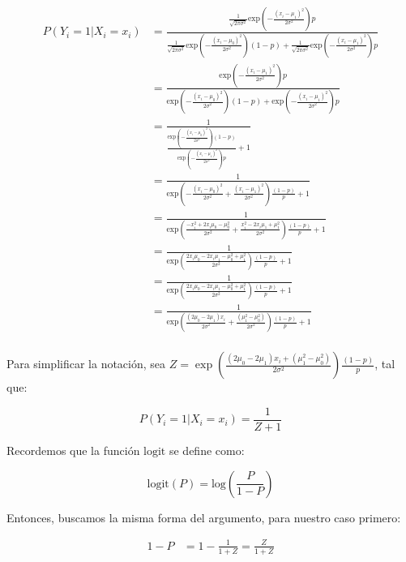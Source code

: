 \begin{align*}
    P(Y_i=1|X_i=x_i)&=\frac{\frac{1}{\sqrt{2\pi\sigma^2}}\text{exp}\left(-\frac{(x_i-\mu_1)^2}{2\sigma^2}\right)p}{\frac{1}{\sqrt{2\pi\sigma^2}}\text{exp}\left(-\frac{(x_i-\mu_0)^2}{2\sigma^2}\right)(1-p)+\frac{1}{\sqrt{2\pi\sigma^2}}\text{exp}\left(-\frac{(x_i-\mu_1)^2}{2\sigma^2}\right)p}\\[0.1cm]
    &=\frac{\text{exp}\left(-\frac{(x_i-\mu_1)^2}{2\sigma^2}\right)p}{\text{exp}\left(-\frac{(x_i-\mu_0)^2}{2\sigma^2}\right)(1-p)+\text{exp}\left(-\frac{(x_i-\mu_1)^2}{2\sigma^2}\right)p}\\[0.1cm]
    &=\frac{1}{\frac{\text{exp}\left(-\frac{(x_i-\mu_0)^2}{2\sigma^2}\right)(1-p)}{\text{exp}\left(-\frac{(x_i-\mu_1)^2}{2\sigma^2}\right)p}+1}\\[0.1cm]
    &=\frac{1}{\text{exp}\left(-\frac{(x_i-\mu_0)^2}{2\sigma^2}+\frac{(x_i-\mu_1)^2}{2\sigma^2}\right)\frac{(1-p)}{p}+1}\\[0.1cm]
    &=\frac{1}{\text{exp}\left(\frac{-x_i^2+2x_i\mu_0-\mu_0^2}{2\sigma^2}+\frac{x_i^2-2x_i\mu_1+\mu_1^2}{2\sigma^2}\right)\frac{(1-p)}{p}+1}\\[0.1cm]
    &=\frac{1}{\text{exp}\left(\frac{2x_i\mu_0-2x_i\mu_1-\mu_0^2+\mu_1^2}{2\sigma^2}\right)\frac{(1-p)}{p}+1}\\[0.1cm]
    &=\frac{1}{\text{exp}\left(\frac{2x_i\mu_0-2x_i\mu_1-\mu_0^2+\mu_1^2}{2\sigma^2}\right)\frac{(1-p)}{p}+1}\\[0.1cm]
    &=\frac{1}{\text{exp}\left(\frac{(2\mu_0-2\mu_1)x_i}{2\sigma^2}+\frac{(\mu_1^2-\mu_0^2)}{2\sigma^2}\right)\frac{(1-p)}{p}+1}\\[0.1cm]
\end{align*}

\newpage
Para simplificar la notación, sea $Z =\exp\left(\frac{(2\mu_0-2\mu_1)x_i+(\mu_1^2-\mu_0^2)}{2\sigma^2}\right)\frac{(1-p)}{p}$, tal que: 

\begin{equation}
    P(Y_i=1|X_i=x_i)=\frac{1}{Z+1}
\end{equation}

Recordemos que la función $\text{logit}$ se define como:

\begin{equation}
    \text{logit}(P)=\text{log}\left(\frac{P}{1-P}\right)
\end{equation}

Entonces, buscamos la misma forma del argumento, para nuestro caso primero:

\begin{align*}
    1-P&=1-\frac{1}{1+Z}=\frac{Z}{1+Z}
\end{align*}

